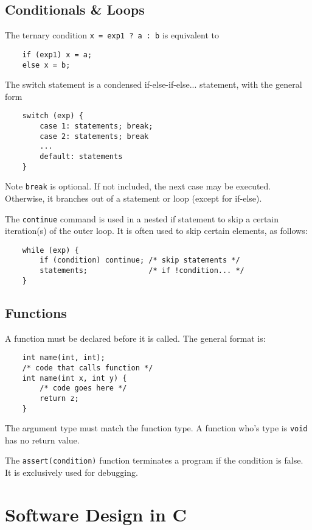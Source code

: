 \documentclass{tufte-book}
\begin{document}
\section{Conditionals \& Loops}
The ternary condition \lstinline{x = exp1 ? a : b} is equivalent to
\begin{lstlisting}
    if (exp1) x = a;
    else x = b;
\end{lstlisting}
The switch statement is a condensed if-else-if-else... statement, with the general form
\begin{lstlisting}
    switch (exp) {
        case 1: statements; break;
        case 2: statements; break
        ...
        default: statements
    }
\end{lstlisting}
Note \lstinline{break} is optional. If not included, the next case may be executed. Otherwise, it branches out of a statement or loop (except for if-else).

\bigskip
The \lstinline{continue} command is used in a nested if statement to skip a certain iteration(s) of the outer loop. It is often used to skip certain elements, as follows:
\begin{lstlisting}
    while (exp) {
        if (condition) continue; /* skip statements */
        statements;              /* if !condition... */
    }
\end{lstlisting}

\section{Functions}

A function must be declared before it is called. The general format is:
\begin{lstlisting}
    int name(int, int);
    /* code that calls function */
    int name(int x, int y) {
        /* code goes here */
        return z;
    }
\end{lstlisting}
The argument type must match the function type. A function who's type is \lstinline{void} has no return value.

\bigskip
The \lstinline{assert(condition)} function terminates a program if the condition is false. It is exclusively used for debugging.

\chapter{Software Design in C}
\end{document}
